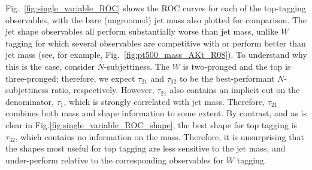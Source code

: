 Fig.~\ref{fig:single_variable_ROC} shows the ROC curves for each of the top-tagging observables, with the bare (ungroomed) jet mass also plotted for comparison. The jet shape observables all perform substantially worse than jet mass, unlike $W$ tagging for which several observables are competitive with or perform better than jet mass (see, for example, Fig.~\ref{fig:pt500_mass_AKt_R08}).
To understand why this is the case, consider $N$-subjettiness. The $W$ is two-pronged and the top is three-pronged; therefore, we expect $\tau_{21}$ and $\tau_{32}$ to be the best-performant $N$-subjettiness ratio, respectively. However, $\tau_{21}$ also contains an implicit cut on the denominator, $\tau_1$, which is strongly correlated with jet mass. Therefore, $\tau_{21}$ combines both mass and shape information to some extent. By contrast, and as is clear in Fig.\ref{fig:single_variable_ROC_shape}, the best shape for top tagging is $\tau_{32}$, which contains no information on the mass. Therefore, it is unsurprising that the  shapes most useful for top tagging are less sensitive to the jet mass, and under-perform relative to the corresponding observables for $W$ tagging.

